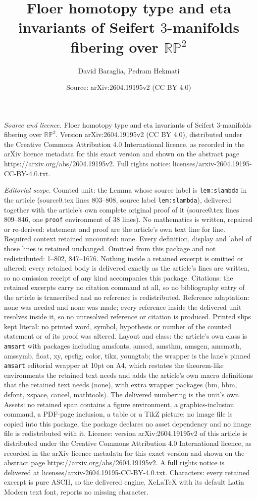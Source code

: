 \documentclass[10pt,a4paper]{amsart}
\title[Floer homotopy type and eta invariants of Seifert $3$-manifo]{Floer homotopy type and eta invariants of Seifert $3$-manifolds fibering over $\mathbb{RP}^2$}
\author{David Baraglia, Pedram Hekmati}
\date{Source: arXiv:2604.19195v2 (CC BY 4.0)}
\begin{document}
\maketitle

\noindent\emph{Source and licence.} Floer homotopy type and eta invariants of Seifert $3$-manifolds fibering over $\mathbb{RP}^2$. Version arXiv:2604.19195v2 (CC BY 4.0), distributed under the Creative Commons Attribution 4.0 International licence, as recorded in the arXiv licence metadata for this exact version and shown on the abstract page https://arxiv.org/abs/2604.19195v2. Full rights notice: licenses/arxiv-2604.19195-CC-BY-4.0.txt.\par\smallskip

\noindent\textit{Editorial scope.} Counted unit: the Lemma whose source label is \texttt{lem:slambda} in the article (source0.tex lines 803--808, source label \texttt{lem:slambda}), delivered together with the article's own complete original proof of it (source0.tex lines 809--846, one \texttt{proof} environment of 38 lines). No mathematics is written, repaired or re-derived: statement and proof are the article's own text line for line. Required context retained uncounted: none. Every definition, display and label of those lines is retained unchanged. Omitted from this package and not redistributed: 1--802, 847--1676. Nothing inside a retained excerpt is omitted or altered: every retained body is delivered exactly as the article's lines are written, so no omission receipt of any kind accompanies this package. Citations: the retained excerpts carry no citation command at all, so no bibliography entry of the article is transcribed and no reference is redistributed. Reference adaptation: none was needed and none was made; every reference inside the delivered unit resolves inside it, so no unresolved reference or citation is produced. Printed slips kept literal: no printed word, symbol, hypothesis or number of the counted statement or of its proof was altered. Layout and class: the article's own class is \texttt{amsart} with packages including amsfonts, amscd, amsthm, amsgen, amsmath, amssymb, float, xy, epsfig, color, tikz, youngtab; the wrapper is the lane's pinned \texttt{amsart} editorial wrapper at 10pt on A4, which restates the theorem-like environments the retained text needs and adds the article's own macro definitions that the retained text needs (none), with extra wrapper packages (bm, bbm, dsfont, xspace, cancel, mathtools). The delivered numbering is the unit's own. Assets: no retained span contains a figure environment, a graphics-inclusion command, a PDF-page inclusion, a table or a TikZ picture; no image file is copied into this package, the package declares no asset dependency and no image file is redistributed with it. Licence: version arXiv:2604.19195v2 of this article is distributed under the Creative Commons Attribution 4.0 International licence, as recorded in the arXiv licence metadata for this exact version and shown on the abstract page https://arxiv.org/abs/2604.19195v2. A full rights notice is delivered at licenses/arxiv-2604.19195-CC-BY-4.0.txt. Characters: every retained excerpt is pure ASCII, so the delivered engine, XeLaTeX with its default Latin Modern text font, reports no missing character.
\end{document}
